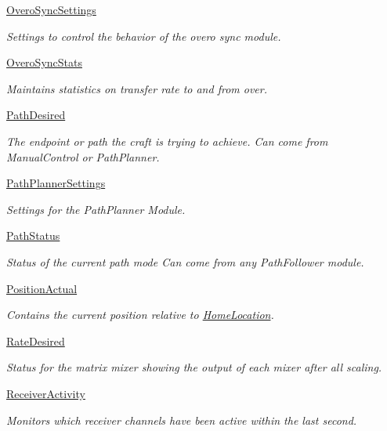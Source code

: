 \begin{DoxyCompactItemize}
\hyperlink{group___overo_sync_settings}{\-Overo\-Sync\-Settings}
\begin{DoxyCompactList}\small\item\em \-Settings to control the behavior of the overo sync module. \end{DoxyCompactList}\item 
\hyperlink{group___overo_sync_stats}{\-Overo\-Sync\-Stats}
\begin{DoxyCompactList}\small\item\em \-Maintains statistics on transfer rate to and from over. \end{DoxyCompactList}\item 
\hyperlink{group___path_desired}{\-Path\-Desired}
\begin{DoxyCompactList}\small\item\em \-The endpoint or path the craft is trying to achieve. \-Can come from \-Manual\-Control or \-Path\-Planner. \end{DoxyCompactList}\item 
\hyperlink{group___path_planner_settings}{\-Path\-Planner\-Settings}
\begin{DoxyCompactList}\small\item\em \-Settings for the \-Path\-Planner \-Module. \end{DoxyCompactList}\item 
\hyperlink{group___path_status}{\-Path\-Status}
\begin{DoxyCompactList}\small\item\em \-Status of the current path mode \-Can come from any \-Path\-Follower module. \end{DoxyCompactList}\item 
\hyperlink{group___position_actual}{\-Position\-Actual}
\begin{DoxyCompactList}\small\item\em \-Contains the current position relative to \hyperlink{group___home_location}{\-Home\-Location}. \end{DoxyCompactList}\item 
\hyperlink{group___rate_desired}{\-Rate\-Desired}
\begin{DoxyCompactList}\small\item\em \-Status for the matrix mixer showing the output of each mixer after all scaling. \end{DoxyCompactList}\item 
\hyperlink{group___receiver_activity}{\-Receiver\-Activity}
\begin{DoxyCompactList}\small\item\em \-Monitors which receiver channels have been active within the last second. \end{DoxyCompactList}\item 

\end{DoxyCompactItemize}
